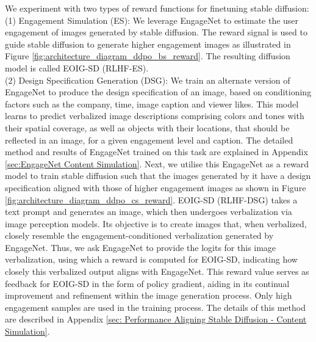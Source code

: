   \noindent We experiment with two types of reward functions for finetuning stable diffusion:\\
(1) Engagement Simulation (ES): We leverage EngageNet to estimate the user engagement of images generated by stable diffusion. The reward signal is used to guide stable diffusion to generate higher engagement images as illustrated in Figure \ref{fig:architecture_diagram_ddpo_bs_reward}. The resulting diffusion model is called EOIG-SD (RLHF-ES).\\
(2) Design Specification Generation (DSG): We train an alternate version of EngageNet to produce the design specification of an image, based on conditioning factors such as the company, time, image caption and viewer likes. This model learns to predict verbalized image descriptions comprising colors and tones with their spatial coverage, as well as objects with their locations, that should be reflected in an image, for a given engagement level and caption. The detailed method and results of EngageNet trained on this task are explained in Appendix \ref{sec:EngageNet Content Simulation}. 
Next, we utilise this EngageNet as a reward model to train stable diffusion such that the images generated by it have a design specification aligned with those of higher engagement images as shown in Figure \ref{fig:architecture_diagram_ddpo_cs_reward}.
EOIG-SD (RLHF-DSG) takes a text prompt and generates an image, which then undergoes verbalization via image perception models. 
Its objective is to create images that, when verbalized, closely resemble the engagement-conditioned verbalization generated by EngageNet. Thus, we ask EngageNet to provide the logits for this image verbalization, using which a reward is computed for EOIG-SD, indicating how closely this verbalized output aligns with EngageNet. This reward value serves as feedback for EOIG-SD in the form of policy gradient, aiding in its continual improvement and refinement within the image generation process. Only high engagement samples are used in the training process.
The details of this method are described in Appendix \ref{sec: Performance Aligning Stable Diffusion - Content Simulation}.

